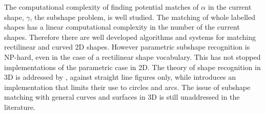 The computational complexity of finding potential matches of $\alpha$ in the current shape, $\gamma$, the subshape problem, is well studied. The matching of whole labelled shapes has a linear computational complexity in the number of the current shapes.
Therefore there are well developed algorithms and systems for matching rectilinear\cite{krishnamurti81,Krishnamurti80} and curved 2D shapes.
However parametric subshape recognition is NP-hard\cite{Yue09}, even in the case of a rectilinear shape vocabulary. This has not stopped implementations of the parametric case in 2D\cite{Mccormack02}. 
The theory of shape recognition in 3D is addressed by \cite{Krishnamurti92}, against straight line figures only, while \cite{Chau04} introduces an implementation that limits their use to circles and arcs. The issue of subshape matching with general curves and surfaces in 3D is still unaddressed in the literature.







